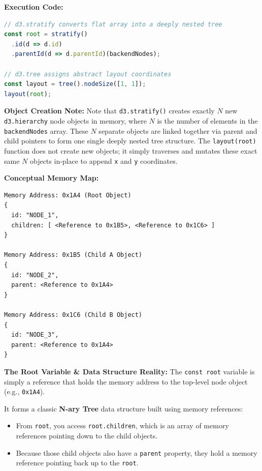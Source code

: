 \documentclass[12pt, a4paper]{article}
\begin{document}
\textbf{Execution Code:}
\begin{lstlisting}[language=javascript, caption={flowUtils.js - D3 Stratify}]
// d3.stratify converts flat array into a deeply nested tree
const root = stratify()
  .id(d => d.id)
  .parentId(d => d.parentId)(backendNodes);

// d3.tree assigns abstract layout coordinates
const layout = tree().nodeSize([1, 1]);
layout(root);
\end{lstlisting}

\textbf{Object Creation Note:}
Note that \texttt{d3.stratify()} creates exactly $N$ new \texttt{d3.hierarchy} node objects in memory, where $N$ is the number of elements in the \texttt{backendNodes} array. These $N$ separate objects are linked together via parent and child pointers to form one single deeply nested tree structure. The \texttt{layout(root)} function does not create new objects; it simply traverses and mutates these exact same $N$ objects in-place to append \texttt{x} and \texttt{y} coordinates.

\textbf{Conceptual Memory Map:}
\begin{codebox}
\begin{verbatim}
Memory Address: 0x1A4 (Root Object)
{
  id: "NODE_1",
  children: [ <Reference to 0x1B5>, <Reference to 0x1C6> ]
}

Memory Address: 0x1B5 (Child A Object)
{
  id: "NODE_2",
  parent: <Reference to 0x1A4>
}

Memory Address: 0x1C6 (Child B Object)
{
  id: "NODE_3",
  parent: <Reference to 0x1A4>
}
\end{verbatim}
\end{codebox}

\textbf{The Root Variable \& Data Structure Reality:}
The \texttt{const root} variable is simply a reference that holds the memory address to the top-level node object (e.g., \texttt{0x1A4}). 

It forms a classic \textbf{N-ary Tree} data structure built using memory references:
\begin{itemize}
    \item From \texttt{root}, you access \texttt{root.children}, which is an array of memory references pointing down to the child objects.
    \item Because those child objects also have a \texttt{parent} property, they hold a memory reference pointing back up to the \texttt{root}.
\end{itemize}
\end{document}
